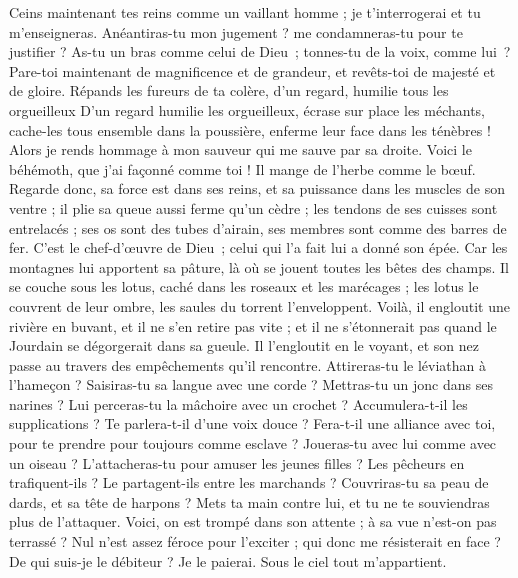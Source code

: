 \begin{multicols}{2}
Ceins maintenant tes reins comme un vaillant homme ; je t'interrogerai et tu m'enseigneras.
Anéantiras-tu mon jugement ? me condamneras-tu pour te justifier ?
As-tu un bras comme celui de Dieu ; tonnes-tu de la voix, comme lui ?
Pare-toi maintenant de magnificence et de grandeur, et revêts-toi de majesté et de gloire.
Répands les fureurs de ta colère, d'un regard, humilie tous les orgueilleux
D'un regard humilie les orgueilleux, écrase sur place les méchants,
cache-les tous ensemble dans la poussière, enferme leur face dans les ténèbres !
Alors je rends hommage à mon sauveur qui me sauve par sa droite.
Voici le béhémoth, que j'ai façonné comme toi ! Il mange de l'herbe comme le bœuf.
Regarde donc, sa force est dans ses reins, et sa puissance dans les muscles de son ventre ;
il plie sa queue aussi ferme qu'un cèdre ; les tendons de ses cuisses sont entrelacés ;
ses os sont des tubes d'airain, ses membres sont comme des barres de fer.
C’est le chef-d’œuvre de Dieu ; celui qui l’a fait lui a donné son épée.
Car les montagnes lui apportent sa pâture, là où se jouent toutes les bêtes des champs.
Il se couche sous les lotus, caché dans les roseaux et les marécages ;
les lotus le couvrent de leur ombre, les saules du torrent l'enveloppent.
Voilà, il engloutit une rivière en buvant, et il ne s'en retire pas vite ; et il ne s'étonnerait pas quand le Jourdain se dégorgerait dans sa gueule. 
Il l'engloutit en le voyant, et son nez passe au travers des empêchements qu'il rencontre.  
Attireras-tu le léviathan à l'hameçon ? Saisiras-tu sa langue avec une corde ?
Mettras-tu un jonc dans ses narines ? Lui perceras-tu la mâchoire avec un crochet ?
Accumulera-t-il les supplications ? Te parlera-t-il d'une voix douce ?
Fera-t-il une alliance avec toi, pour te prendre pour toujours comme esclave ?
Joueras-tu avec lui comme avec un oiseau ? L'attacheras-tu pour amuser les jeunes filles ?
Les pêcheurs en trafiquent-ils ? Le partagent-ils entre les marchands ?
Couvriras-tu sa peau de dards, et sa tête de harpons ?
Mets ta main contre lui, et tu ne te souviendras plus de l'attaquer.
Voici, on est trompé dans son attente ; à sa vue n'est-on pas terrassé ?
\VerseOne{}Nul n'est assez féroce pour l'exciter ; qui donc me résisterait en face ?
De qui suis-je le débiteur ? Je le paierai. Sous le ciel tout m'appartient.

\end{multicols}
